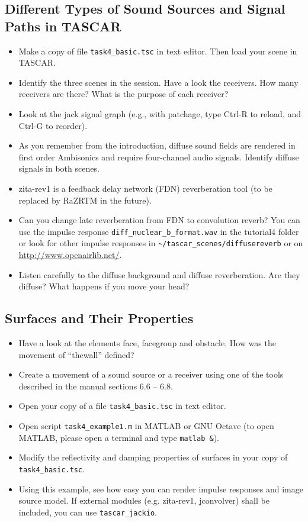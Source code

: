 \documentclass[11pt,a4paper,twoside]{article}
\begin{document}
\subsection*{Different Types of Sound Sources and Signal Paths in TASCAR}
\begin{itemize}
\item Make a copy of file \verb!task4_basic.tsc! in text editor. Then load
  your scene in TASCAR.
\item Identify the three scenes in the session. Have a look the
  receivers. How many receivers are there? What is the purpose of each
  receiver?
\item Look at the jack signal graph (e.g., with patchage, type Ctrl-R
  to reload, and Ctrl-G to reorder).
\item As you remember from the introduction, diffuse sound fields are
  rendered in first order Ambisonics and require four-channel audio
  signals. Identify diffuse signals in both scenes.
\item zita-rev1 is a feedback delay network (FDN) reverberation tool
  (to be replaced by RaZRTM in the future).
\item Can you change late reverberation from FDN to convolution
  reverb? You can use the impulse response
  \verb!diff_nuclear_b_format.wav!  in the tutorial4 folder or look
  for other impulse responses in \verb!~/tascar_scenes/diffusereverb!
  or on \url{http://www.openairlib.net/}.
\item Listen carefully to the diffuse background and diffuse
  reverberation. Are they diffuse?  What happens if you move your
  head?
\end{itemize}

\subsection*{Surfaces and Their Properties}
  
\begin{itemize}
\item Have a look at the elements face, facegroup and obstacle. How
  was the movement of ``thewall'' defined?
\item Create a movement of a sound source or a receiver using one of
  the tools described in the manual sections 6.6 – 6.8.
\item Open your copy of a file \verb!task4_basic.tsc! in text editor.
\item Open script \verb!task4_example1.m! in MATLAB or GNU Octave (to
  open MATLAB, please open a terminal and type \verb!matlab &!).
\item Modify the reflectivity and damping properties of surfaces in
  your copy of \verb!task4_basic.tsc!.
\item Using this example, see how easy you can render impulse
  responses and image source model. If external modules
  (e.g. zita-rev1, jconvolver) shall be included, you can use
  \verb!tascar_jackio!.
\end{itemize}


\fi
\end{document}

